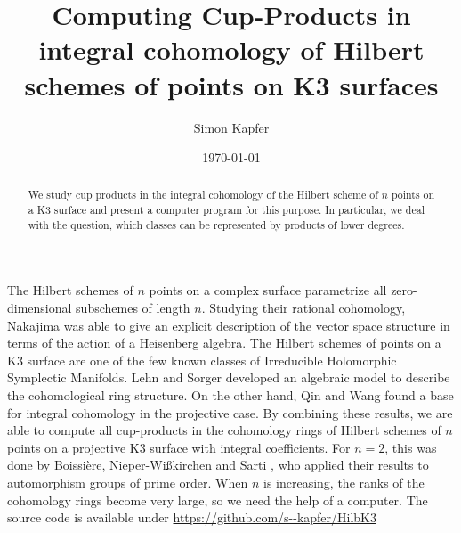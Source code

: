 \documentclass{amsart}
\DeclareMathOperator{\Hilb}{Hilb}
\newcommand{\IZ}{\mathbb{Z}}
\theoremstyle{plain}
\theoremstyle{definition}
\theoremstyle{remark}
\begin{document}
\title[Products in $H^\ast(\Hilb^n(K3), \IZ)$]{Computing Cup-Products in integral cohomology of Hilbert schemes of points on K3 surfaces}


\author{Simon Kapfer}
\address{Simon Kapfer, Laboratoire de Math\'ematiques et Applications, UMR CNRS 6086, Universit\'e de Poitiers, T\'el\'eport 2, Boulevard Marie et Pierre Curie, F-86962 Futuroscope Chasseneuil}


\date{\today}


\begin{abstract} 

We study cup 
products in the integral cohomology of the Hilbert scheme of $n$ points on a K3 surface and present a computer program for this purpose. In particular, we deal with the question, which classes can be represented by products of lower degrees.
\end{abstract}

\maketitle


The Hilbert schemes of $n$ points on a complex surface parametrize all zero-dimensional subschemes of length $n$. Studying their rational cohomology, Nakajima \cite{Nakajima} was able to give an explicit description of the vector space structure in terms of the action of a Heisenberg algebra.
The Hilbert schemes of points on a K3 surface are one of the few known classes of Irreducible Holomorphic Symplectic Manifolds. Lehn and Sorger \cite{LehnSorger} developed an algebraic model to describe the cohomological ring structure. On the other hand, Qin and Wang \cite{QinWang} found a base for integral cohomology in the projective case. By combining these results, we are able to compute all cup-products in the cohomology rings of Hilbert schemes of $n$ points on a projective K3 surface with integral coefficients. 
For $n=2$, this was done by Boissi\`ere, Nieper-Wi{\ss}kirchen and Sarti \cite{BNS}, who applied their results to automorphism groups of prime order. When $n$ is increasing, the ranks of the cohomology rings become very large, so we need the help of a computer. The source code is available under \url{https://github.com/s--kapfer/HilbK3}
\end{document}
